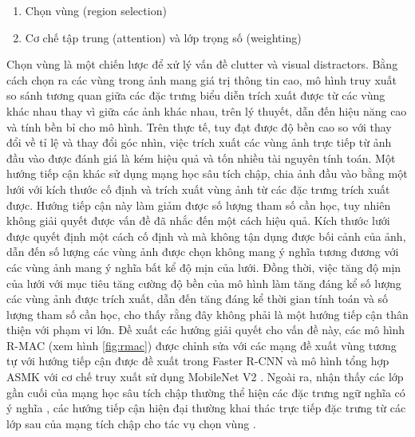 \begin{enumerate}
    \item Chọn vùng (region selection)
    \item Cơ chế tập trung (attention) và lớp trọng số (weighting)
\end{enumerate}

Chọn vùng là một chiến lược để xử lý vấn đề clutter và visual distractors. Bằng cách chọn ra các vùng trong ảnh mang giá trị thông tin cao, mô hình truy xuất so sánh tương quan giữa các đặc trưng biểu diễn trích xuất được từ các vùng khác nhau thay vì giữa các ảnh khác nhau, trên lý thuyết, dẫn đến hiệu năng cao và tính bền bỉ cho mô hình. Trên thực tế, tuy đạt được độ bền cao so với thay đổi về tỉ lệ và thay đổi góc nhìn, việc trích xuất các vùng ảnh trực tiếp từ ảnh đầu vào được đánh giá là kém hiệu quả và tốn nhiều tài nguyên tính toán. Một hướng tiếp cận khác sử dụng mạng học sâu tích chập, chia ảnh đầu vào bằng một lưới với kích thước cố định và trích xuất vùng ảnh từ các đặc trưng trích xuất được\cite{razavian2016visual, tolias2015particular}. Hướng tiếp cận này làm giảm được số lượng tham số cần học, tuy nhiên không giải quyết được vấn đề đã nhắc đến một cách hiệu quả. Kích thước lưới được quyết định một cách cố định và mà không tận dụng được bối cảnh của ảnh, dẫn đến số lượng các vùng ảnh được chọn không mang ý nghĩa tương đương với các vùng ảnh mang ý nghĩa bất kể độ mịn của lưới. Đồng thời, việc tăng độ mịn của lưới với mục tiêu tăng cường độ bền của mô hình làm tăng đáng kể số lượng các vùng ảnh được trích xuất, dẫn đến tăng đáng kể thời gian tính toán và số lượng tham số cần học, cho thấy rằng đây không phải là một hướng tiếp cận thân thiện với phạm vi lớn. Đề xuất các hướng giải quyết cho vấn đề này, các mô hình R-MAC \cite{tolias2015particular} (xem hình \ref{fig:rmac}) được chỉnh sửa với các mạng đề xuất vùng tương tự với hướng tiếp cận được đề xuất trong Faster R-CNN \cite{ren2015faster} và mô hình tổng hợp ASMK \cite{selective-match-kernel} với cơ chế truy xuất sử dụng MobileNet V2 \cite{sandler2018mobilenetv2, teichmann2019detect}. Ngoài ra, nhận thấy các lớp gần cuối của mạng học sâu tích chập thường thể hiện các đặc trưng ngữ nghĩa có ý nghĩa \cite{ZeilerVisualizingAU}, các hướng tiếp cận hiện đại thường khai thác trực tiếp đặc trưng từ các lớp sau của mạng tích chập cho tác vụ chọn vùng \cite{chen2017only, khaliq2019holistic}.

